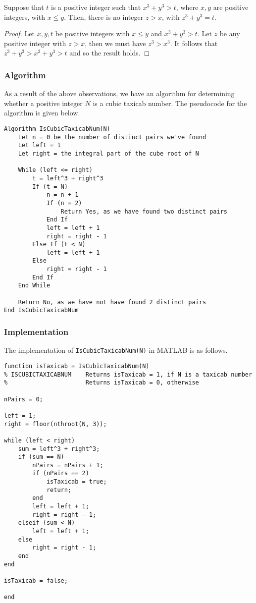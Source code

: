 \begin{observation}
	Suppose that $t$ is a positive integer such that $x^3 + y^3 > t$, where $x, y$ are positive integers, with $x \leq y$. Then, there is no integer $z > x$, with $z^3 + y^3 = t$.
\end{observation}
\begin{proof}
	Let $x, y, t$ be positive integers with $x \leq y$ and $x^3 + y^3 > t$. Let $z$ be any positive integer with $z > x$, then we must have $z^3 > x^3$. It follows that $z^3 + y^3 > x^3 + y^3 > t$ and so the result holds.
\end{proof}

\subsubsection{Algorithm}
As a result of the above observations, we have an algorithm for determining whether a positive integer $N$ is a cubic taxicab number. The pseudocode for the algorithm is given below.

\begin{lstlisting}
Algorithm IsCubicTaxicabNum(N)
	Let n = 0 be the number of distinct pairs we've found
	Let left = 1
	Let right = the integral part of the cube root of N
	
	While (left <= right)
		t = left^3 + right^3
		If (t = N)
			n = n + 1
			If (n = 2)
				Return Yes, as we have found two distinct pairs
			End If
			left = left + 1
			right = right - 1
		Else If (t < N)
			left = left + 1
		Else
			right = right - 1
		End If
	End While
	
	Return No, as we have not have found 2 distinct pairs
End IsCubicTaxicabNum
\end{lstlisting}

\subsubsection{Implementation}
The implementation of \lstinline|IsCubicTaxicabNum(N)| in MATLAB is as follows.

\begin{lstlisting}
function isTaxicab = IsCubicTaxicabNum(N)
% ISCUBICTAXICABNUM    Returns isTaxicab = 1, if N is a taxicab number
%                      Returns isTaxicab = 0, otherwise

nPairs = 0;

left = 1;
right = floor(nthroot(N, 3));

while (left < right)
    sum = left^3 + right^3;
    if (sum == N)
        nPairs = nPairs + 1;
        if (nPairs == 2)
            isTaxicab = true;
            return;
        end
        left = left + 1;
        right = right - 1;
    elseif (sum < N)
        left = left + 1;
    else
        right = right - 1;
    end
end

isTaxicab = false;

end
\end{lstlisting}

